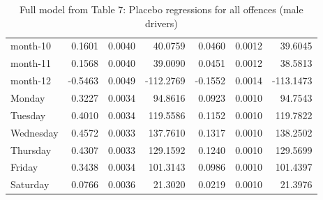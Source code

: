 \documentclass[10pt]{article}
\begin{document}
\begin{table}[ht]
\begin{tabular}{lrrrrrr}
  month-10 & 0.1601 & 0.0040 & 40.0759 & 0.0460 & 0.0012 & 39.6045 \\ 
  month-11 & 0.1568 & 0.0040 & 39.0090 & 0.0451 & 0.0012 & 38.5813 \\ 
  month-12 & -0.5463 & 0.0049 & -112.2769 & -0.1552 & 0.0014 & -113.1473 \\ 
  Monday & 0.3227 & 0.0034 & 94.8616 & 0.0923 & 0.0010 & 94.7543 \\ 
  Tuesday & 0.4010 & 0.0034 & 119.5586 & 0.1152 & 0.0010 & 119.7822 \\ 
  Wednesday & 0.4572 & 0.0033 & 137.7610 & 0.1317 & 0.0010 & 138.2502 \\ 
  Thursday & 0.4307 & 0.0033 & 129.1592 & 0.1240 & 0.0010 & 129.5699 \\ 
  Friday & 0.3438 & 0.0034 & 101.3143 & 0.0986 & 0.0010 & 101.4397 \\ 
  Saturday & 0.0766 & 0.0036 & 21.3020 & 0.0219 & 0.0010 & 21.3976 \\ 
   \hline
\end{tabular}
\caption{Full model from Table 7: Placebo regressions for all offences (male drivers)} 
\label{tab_7_all_pts_no_age_M}
\end{table}


\clearpage
\pagebreak



\end{document}
